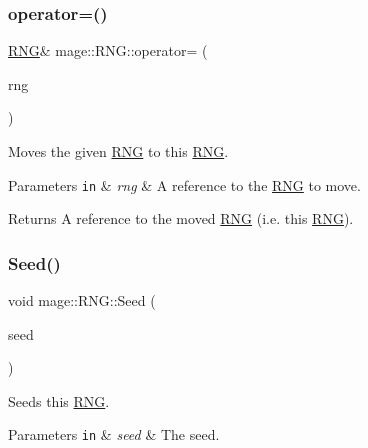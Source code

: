 \subsubsection{\texorpdfstring{operator=()}{operator=()}\hspace{0.1cm}{\footnotesize\ttfamily [2/2]}}
{\footnotesize\ttfamily \mbox{\hyperlink{classmage_1_1_r_n_g}{R\+NG}}\& mage\+::\+R\+N\+G\+::operator= (\begin{DoxyParamCaption}\item[{\mbox{\hyperlink{classmage_1_1_r_n_g}{R\+NG}} \&\&}]{rng }\end{DoxyParamCaption})\hspace{0.3cm}{\ttfamily [delete]}}

Moves the given \mbox{\hyperlink{classmage_1_1_r_n_g}{R\+NG}} to this \mbox{\hyperlink{classmage_1_1_r_n_g}{R\+NG}}.


\begin{DoxyParams}[1]{Parameters}
\mbox{\tt in}  & {\em rng} & A reference to the \mbox{\hyperlink{classmage_1_1_r_n_g}{R\+NG}} to move. \\
\hline
\end{DoxyParams}
\begin{DoxyReturn}{Returns}
A reference to the moved \mbox{\hyperlink{classmage_1_1_r_n_g}{R\+NG}} (i.\+e. this \mbox{\hyperlink{classmage_1_1_r_n_g}{R\+NG}}). 
\end{DoxyReturn}
\mbox{\label{classmage_1_1_r_n_g_a1d7bc2fd5525a252d4900f5dd4754162}} 
\subsubsection{\texorpdfstring{Seed()}{Seed()}}
{\footnotesize\ttfamily void mage\+::\+R\+N\+G\+::\+Seed (\begin{DoxyParamCaption}\item[{\mbox{\hyperlink{namespacemage_aa5d6eaabaac3cdd01873d6a3d27e90f3}{U32}}}]{seed }\end{DoxyParamCaption})\hspace{0.3cm}{\ttfamily [noexcept]}}

Seeds this \mbox{\hyperlink{classmage_1_1_r_n_g}{R\+NG}}.


\begin{DoxyParams}[1]{Parameters}
\mbox{\tt in}  & {\em seed} & The seed. \\
\hline
\end{DoxyParams}
\mbox{\label{classmage_1_1_r_n_g_adaedb39747705386b1a55d6fa47ce78c}} 
